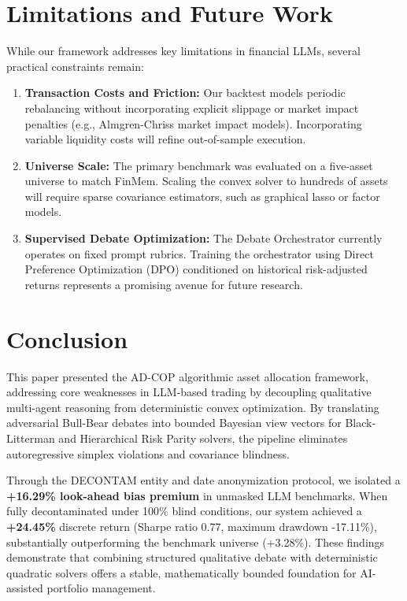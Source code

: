 \documentclass[conference]{IEEEtran}
\begin{document}
\section{Limitations and Future Work}

While our framework addresses key limitations in financial LLMs, several practical constraints remain:
\begin{enumerate}
    \item \textbf{Transaction Costs and Friction:} Our backtest models periodic rebalancing without incorporating explicit slippage or market impact penalties (e.g., Almgren-Chriss market impact models). Incorporating variable liquidity costs will refine out-of-sample execution.
    \item \textbf{Universe Scale:} The primary benchmark was evaluated on a five-asset universe to match FinMem. Scaling the convex solver to hundreds of assets will require sparse covariance estimators, such as graphical lasso or factor models.
    \item \textbf{Supervised Debate Optimization:} The Debate Orchestrator currently operates on fixed prompt rubrics. Training the orchestrator using Direct Preference Optimization (DPO) conditioned on historical risk-adjusted returns represents a promising avenue for future research.
\end{enumerate}

\section{Conclusion}

This paper presented the AD-COP algorithmic asset allocation framework, addressing core weaknesses in LLM-based trading by decoupling qualitative multi-agent reasoning from deterministic convex optimization. By translating adversarial Bull-Bear debates into bounded Bayesian view vectors for Black-Litterman and Hierarchical Risk Parity solvers, the pipeline eliminates autoregressive simplex violations and covariance blindness.

Through the DECONTAM entity and date anonymization protocol, we isolated a \textbf{+16.29\% look-ahead bias premium} in unmasked LLM benchmarks. When fully decontaminated under 100\% blind conditions, our system achieved a \textbf{+24.45\%} discrete return (Sharpe ratio 0.77, maximum drawdown -17.11\%), substantially outperforming the benchmark universe (+3.28\%). These findings demonstrate that combining structured qualitative debate with deterministic quadratic solvers offers a stable, mathematically bounded foundation for AI-assisted portfolio management.
\end{document}
